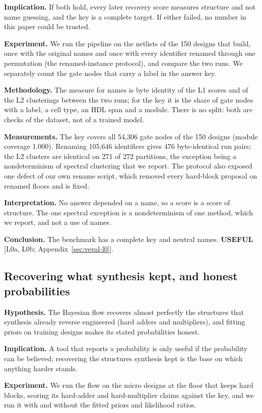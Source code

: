\documentclass[conference]{IEEEtran}
\newcommand{\verdict}[1]{\textbf{\textsc{#1}}}
\newcommand{\hev}[1]{\par\smallskip\noindent\textbf{#1}}
\begin{document}
\hev{Implication.} If both hold, every later recovery score measures structure and not name guessing, and the key is a complete target. If either failed, no number in this paper could be trusted.

\hev{Experiment.} We run the pipeline on the netlists of the 150 designs that build, once with the original names and once with every identifier renamed through one permutation (the renamed-instance protocol), and compare the two runs. We separately count the gate nodes that carry a label in the answer key.

\hev{Methodology.} The measure for names is byte identity of the L1 scores and of the L2 clusterings between the two runs; for the key it is the share of gate nodes with a label, a cell type, an HDL span and a module. There is no split: both are checks of the dataset, not of a trained model.

\hev{Measurements.} The key covers all 54,306 gate nodes of the 150 designs (module coverage 1.000). Renaming 105,646 identifiers gives 476 byte-identical run pairs; the L2 clusters are identical on 271 of 272 partitions, the exception being a nondeterminism of spectral clustering that we report. The protocol also exposed one defect of our own rename script, which removed every hard-block proposal on renamed floors and is fixed.

\hev{Interpretation.} No answer depended on a name, so a score is a score of structure. The one spectral exception is a nondeterminism of one method, which we report, and not a use of names.

\hev{Conclusion.} The benchmark has a complete key and neutral names. \verdict{USEFUL} [L0a, L0b; Appendix~\ref{sec:veval-l0}].

\subsection{Recovering what synthesis kept, and honest probabilities}
\label{arg:ra2}

\hev{Hypothesis.} The Bayesian flow recovers almost perfectly the structures that synthesis already reverse engineered (hard adders and multipliers), and fitting priors on training designs makes its stated probabilities honest.

\hev{Implication.} A tool that reports a probability is only useful if the probability can be believed; recovering the structures synthesis kept is the base on which anything harder stands.

\hev{Experiment.} We run the flow on the micro designs at the floor that keeps hard blocks, scoring its hard-adder and hard-multiplier claims against the key, and we run it with and without the fitted priors and likelihood ratios.
\end{document}
